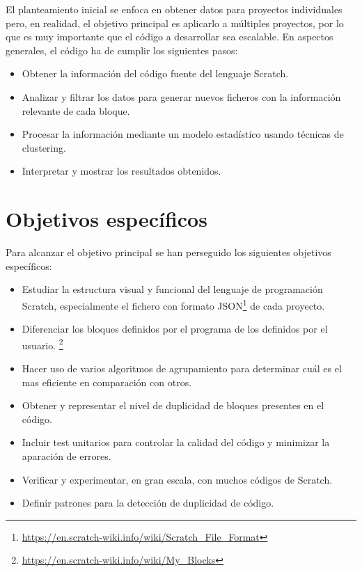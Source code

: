\documentclass[a4paper, 12pt]{book}
\begin{document}
El planteamiento inicial se enfoca en obtener datos para proyectos individuales pero, en realidad, el objetivo principal es aplicarlo a múltiples proyectos, por lo que es muy importante que el código a desarrollar sea escalable. En aspectos generales, el código ha de cumplir los siguientes pasos:

\begin{itemize}
  \item Obtener la información del código fuente del lenguaje Scratch.
  \item Analizar y filtrar los datos para generar nuevos ficheros con la información relevante de cada bloque.
  \item Procesar la información mediante un modelo estadístico usando técnicas de clustering.
  \item Interpretar y mostrar los resultados obtenidos.
\end{itemize}


\section{Objetivos específicos}
\label{sec:objetivos-especificos}

Para alcanzar el objetivo principal se han perseguido los siguientes objetivos específicos:


\begin{itemize}
  	\item Estudiar la estructura visual y funcional del lenguaje de programación Scratch, especialmente el fichero con formato JSON\footnote{\url{https://en.scratch-wiki.info/wiki/Scratch_File_Format}} de cada proyecto.
  	\item Diferenciar los bloques definidos por el programa de los definidos por el usuario. \footnote{\url{https://en.scratch-wiki.info/wiki/My_Blocks}}
  	\item Hacer uso de varios algoritmos de agrupamiento para determinar cuál es el mas eficiente en comparación con otros.
  	\item Obtener y representar el nivel de duplicidad de bloques presentes en el código. 	
 	\item Incluir test unitarios para controlar la calidad del código y minimizar la aparación de errores.  	
	\item Verificar y experimentar, en gran escala, con muchos códigos de Scratch.
	\item Definir patrones para la detección de duplicidad de código.
\end{itemize}
\end{document}
